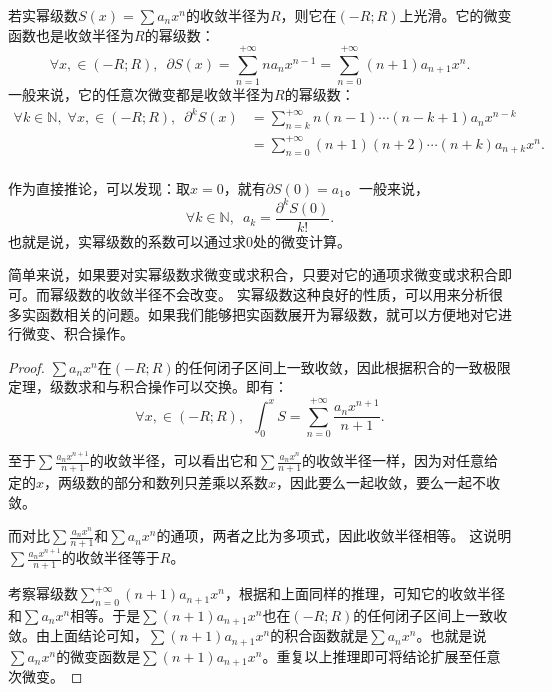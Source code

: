 \documentclass[12pt,UTF8]{ctexbook}
\begin{document}
\begin{appendix}
\begin{tm}\label{tm:c-4-30}
    若实幂级数$S(x) = \sum a_n x^n$的收敛半径为$R$，则它在$(-R;R)$上光滑。它的微变函数也是收敛半径为$R$的幂级数：
    $$ \forall x, \in (-R;R),\,\,\, \partial S(x) =  \sum_{n=1}^{+\infty} na_n x^{n-1} = \sum_{n=0}^{+\infty} (n + 1)a_{n+1} x^{n}. $$
    一般来说，它的任意次微变都是收敛半径为$R$的幂级数：
    \begin{align*}
        \forall k \in \mathbb{N},\;\forall x, \in (-R;R),\,\,\, \partial^k S(x) &= \sum_{n=k}^{+\infty} n(n-1)\cdots(n - k + 1)a_n x^{n-k} \\
        &= \sum_{n=0}^{+\infty} (n + 1)(n + 2)\cdots(n + k)a_{n+k} x^{n}. \\
    \end{align*}
\end{tm}

作为直接推论，可以发现：取$x=0$，就有$\partial S(0) = a_1$。一般来说，
$$\forall k\in \mathbb{N}, \,\,\, a_k = \frac{\partial^k S(0)}{k!}.$$
也就是说，实幂级数的系数可以通过求$0$处的微变计算。

简单来说，如果要对实幂级数求微变或求积合，只要对它的通项求微变或求积合即可。而幂级数的收敛半径不会改变。
实幂级数这种良好的性质，可以用来分析很多实函数相关的问题。如果我们能够把实函数展开为幂级数，就可以方便地对它进行微变、积合操作。

\begin{proof}
    $\sum a_n x^n$在$(-R;R)$的任何闭子区间上一致收敛，因此根据积合的一致极限定理，级数求和与积合操作可以交换。即有：
    $$ \forall x, \in (-R;R),\,\,\, \int_0^x S = \sum_{n=0}^{+\infty} \frac{a_n x^{n+1}}{n + 1}. $$
    
    至于$\sum \frac{a_n x^{n+1}}{n + 1}$的收敛半径，可以看出它和$\sum \frac{a_n x^{n}}{n + 1}$的收敛半径一样，因为对任意给定的$x$，两级数的部分和数列只差乘以系数$x$，因此要么一起收敛，要么一起不收敛。
    
    而对比$\sum \frac{a_n x^{n}}{n + 1}$和$\sum a_n x^n$的通项，两者之比为多项式，因此收敛半径相等。    这说明$\sum \frac{a_n x^{n+1}}{n + 1}$的收敛半径等于$R$。

    考察幂级数$\sum_{n=0}^{+\infty} (n + 1)a_{n+1} x^{n}$，根据和上面同样的推理，可知它的收敛半径和$\sum a_n x^n$相等。于是$\sum (n + 1)a_{n+1} x^{n}$也在$(-R;R)$的任何闭子区间上一致收敛。由上面结论可知，$\sum (n + 1)a_{n+1} x^{n}$的积合函数就是$\sum a_n x^n$。也就是说$\sum a_n x^n$的微变函数是$\sum (n + 1)a_{n+1} x^{n}$。重复以上推理即可将结论扩展至任意次微变。

\end{proof}


\end{appendix}
\end{document}
